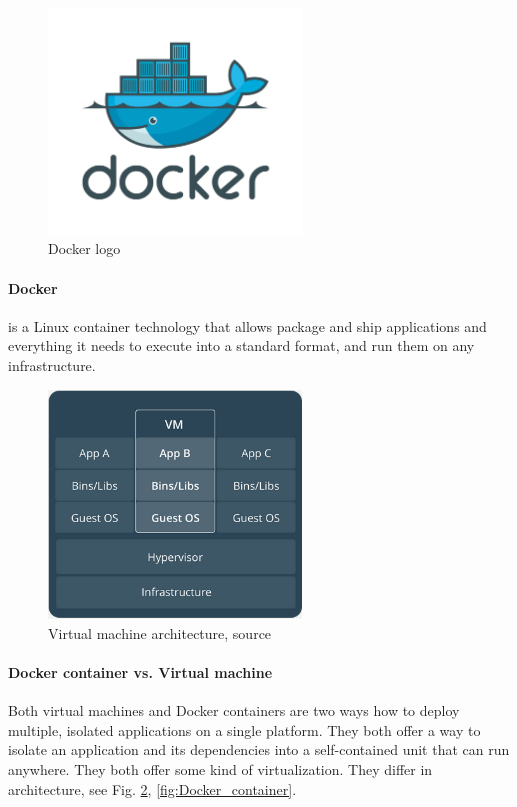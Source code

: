 \documentclass[12pt,a4paper]{article}
\begin{document}
\newpage
\begin{figure}[h!]
\centering
\includegraphics[width=0.6\textwidth]{img/Docker_logo}
\caption{Docker logo}
\label{fig:Docker_logo}
\end{figure}

\paragraph{Docker} is a Linux container technology that allows package and ship applications and everything it needs to execute into a standard
format, and run them on any infrastructure.

\begin{figure}[h!]
\centering
\includegraphics[width=0.6\textwidth]{img/Docker_VM.png}
\caption{Virtual machine architecture, source \cite{Docker_docs}}
\label{fig:Docker_VM}
\end{figure}

\paragraph{Docker container vs. Virtual machine}
Both virtual machines and Docker containers are two ways how to deploy multiple, isolated applications on a single platform. They
both offer a way to isolate an application and its dependencies into a self-contained unit that can run anywhere. They both offer
some kind of virtualization. They differ in architecture, see Fig. \ref{fig:Docker_VM}, \ref{fig:Docker_container}.
\end{document}

